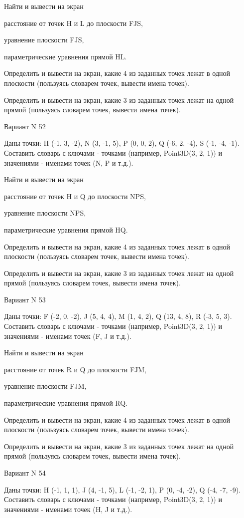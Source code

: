 \documentclass[11pt]{report}
\begin{document}
Найти и вывести на экран


расстояние от точек H и L до плоскости FJS,


уравнение плоскости FJS,


параметрические уравнения прямой HL.


Определить и вывести на экран, какие 4 из заданных точек лежат в одной плоскости (пользуясь словарем точек, вывести имена точек).


Определить и вывести на экран, какие 3 из заданных точек лежат на одной прямой (пользуясь словарем точек, вывести имена точек).

\newpage
Вариант N 52

Даны точки: H (-1, 3, -2), N (3, -1, 5), P (0, 0, 2), Q (-6, 2, -4), S (-1, -4, -1).
Составить словарь с ключами - точками (например, Point3D(3, 2, 1)) и значениями - именами точек (N, P и т.д.).


Найти и вывести на экран


расстояние от точек H и Q до плоскости NPS,


уравнение плоскости NPS,


параметрические уравнения прямой HQ.


Определить и вывести на экран, какие 4 из заданных точек лежат в одной плоскости (пользуясь словарем точек, вывести имена точек).


Определить и вывести на экран, какие 3 из заданных точек лежат на одной прямой (пользуясь словарем точек, вывести имена точек).

\newpage
Вариант N 53

Даны точки: F (-2, 0, -2), J (5, 4, 4), M (1, 4, 2), Q (13, 4, 8), R (-3, 5, 3).
Составить словарь с ключами - точками (например, Point3D(3, 2, 1)) и значениями - именами точек (F, J и т.д.).


Найти и вывести на экран


расстояние от точек R и Q до плоскости FJM,


уравнение плоскости FJM,


параметрические уравнения прямой RQ.


Определить и вывести на экран, какие 4 из заданных точек лежат в одной плоскости (пользуясь словарем точек, вывести имена точек).


Определить и вывести на экран, какие 3 из заданных точек лежат на одной прямой (пользуясь словарем точек, вывести имена точек).

\newpage
Вариант N 54

Даны точки: H (-1, 1, 1), J (4, -1, 5), L (-1, -2, 1), P (0, -4, -2), Q (-4, -7, -9).
Составить словарь с ключами - точками (например, Point3D(3, 2, 1)) и значениями - именами точек (H, J и т.д.).
\end{document}

